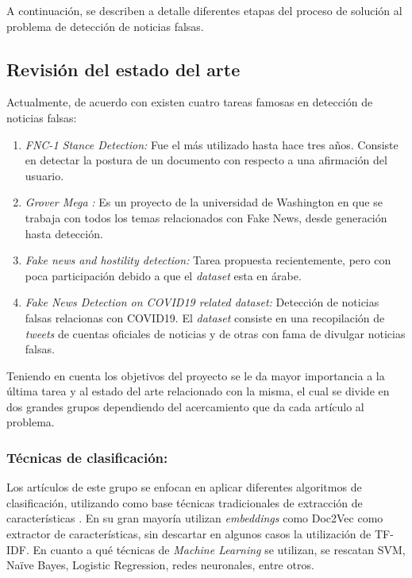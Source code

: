 A continuación, se describen a detalle diferentes etapas del proceso de solución al problema de detección de noticias falsas.

\subsection{Revisión del estado del arte}
Actualmente, de acuerdo con \cite{PapersWithCodeBenchmark} existen cuatro tareas famosas en detección de noticias falsas:
\begin{enumerate}
    \item \textit{FNC-1 Stance Detection:} Fue el más utilizado hasta hace tres años. Consiste en detectar la postura de un documento con respecto a una afirmación del usuario.
    \item \textit{Grover Mega} \cite{grover}\textit{:} Es un proyecto de la universidad de Washington en que se trabaja con todos los temas relacionados con Fake News, desde generación hasta detección.
    \item \textit{Fake news and hostility detection:} Tarea propuesta recientemente, pero con poca participación debido a que el \textit{dataset} esta en árabe.
    \item \textit{Fake News Detection on COVID19 related dataset:} Detección de noticias falsas relacionas con COVID19. El \textit{dataset} consiste en una recopilación de \textit{tweets} de cuentas oficiales de noticias y de otras con fama de divulgar noticias falsas.
\end{enumerate}

Teniendo en cuenta los objetivos del proyecto se le da mayor importancia a la última tarea y al estado del arte relacionado con la misma, el cual se divide en dos grandes grupos dependiendo del acercamiento que da cada artículo al problema.

\subsubsection{Técnicas de clasificación:}
Los artículos de este grupo se enfocan en aplicar diferentes algoritmos de clasificación, utilizando como base técnicas tradicionales de extracción de características \cite{List2, List1, Constraint, List3, List4, FightingInfodemic}. En su gran mayoría utilizan \textit{embeddings} como Doc2Vec como extractor de características, sin descartar en algunos casos la utilización de TF-IDF. En cuanto a qué técnicas de \textit{Machine Learning} se utilizan, se rescatan SVM, Naïve Bayes, Logistic Regression, redes neuronales, entre otros.\\

